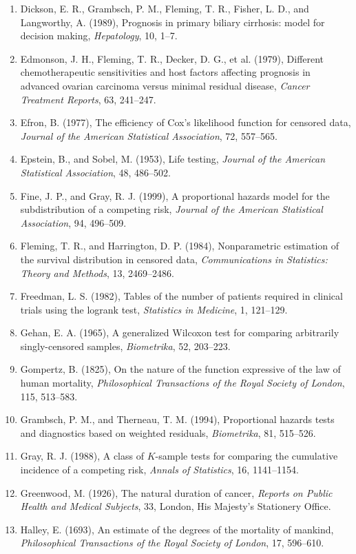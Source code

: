\documentclass[11pt,a4paper]{article}
\numberwithin{equation}{section}
\theoremstyle{definition}
\begin{document}
\begin{enumerate}
\item Dickson, E. R., Grambsch, P. M., Fleming, T. R., Fisher, L. D., and Langworthy, A. (1989), Prognosis in primary biliary cirrhosis: model for decision making, \emph{Hepatology}, 10, 1--7.
\item Edmonson, J. H., Fleming, T. R., Decker, D. G., et al. (1979), Different chemotherapeutic sensitivities and host factors affecting prognosis in advanced ovarian carcinoma versus minimal residual disease, \emph{Cancer Treatment Reports}, 63, 241--247.
\item Efron, B. (1977), The efficiency of Cox's likelihood function for censored data, \emph{Journal of the American Statistical Association}, 72, 557--565.
\item Epstein, B., and Sobel, M. (1953), Life testing, \emph{Journal of the American Statistical Association}, 48, 486--502.
\item Fine, J. P., and Gray, R. J. (1999), A proportional hazards model for the subdistribution of a competing risk, \emph{Journal of the American Statistical Association}, 94, 496--509.
\item Fleming, T. R., and Harrington, D. P. (1984), Nonparametric estimation of the survival distribution in censored data, \emph{Communications in Statistics: Theory and Methods}, 13, 2469--2486.
\item Freedman, L. S. (1982), Tables of the number of patients required in clinical trials using the logrank test, \emph{Statistics in Medicine}, 1, 121--129.
\item Gehan, E. A. (1965), A generalized Wilcoxon test for comparing arbitrarily singly-censored samples, \emph{Biometrika}, 52, 203--223.
\item Gompertz, B. (1825), On the nature of the function expressive of the law of human mortality, \emph{Philosophical Transactions of the Royal Society of London}, 115, 513--583.
\item Grambsch, P. M., and Therneau, T. M. (1994), Proportional hazards tests and diagnostics based on weighted residuals, \emph{Biometrika}, 81, 515--526.
\item Gray, R. J. (1988), A class of $K$-sample tests for comparing the cumulative incidence of a competing risk, \emph{Annals of Statistics}, 16, 1141--1154.
\item Greenwood, M. (1926), The natural duration of cancer, \emph{Reports on Public Health and Medical Subjects}, 33, London, His Majesty's Stationery Office.
\item Halley, E. (1693), An estimate of the degrees of the mortality of mankind, \emph{Philosophical Transactions of the Royal Society of London}, 17, 596--610.

\end{enumerate}
\end{document}
